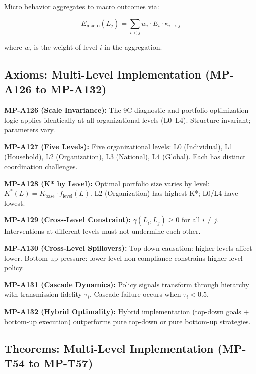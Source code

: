 Micro behavior aggregates to macro outcomes via:

\begin{equation}
E_{\text{macro}}(L_j) = \sum_{i < j} w_i \cdot E_i \cdot \kappa_{i \to j}
\end{equation}

where $w_i$ is the weight of level $i$ in the aggregation.

\subsection{Axioms: Multi-Level Implementation (MP-A126 to MP-A132)}

\begin{tcolorbox}[colback=red!3!white, colframe=red!50!black,
    title=\textbf{Axioms: Multi-Level Implementation Theory (Chapter 23)}]

\textbf{MP-A126 (Scale Invariance):} The 9C diagnostic and portfolio optimization logic applies identically at all organizational levels (L0--L4). Structure invariant; parameters vary.

\textbf{MP-A127 (Five Levels):} Five organizational levels: L0 (Individual), L1 (Household), L2 (Organization), L3 (National), L4 (Global). Each has distinct coordination challenges.

\textbf{MP-A128 (K* by Level):} Optimal portfolio size varies by level: $K^*(L) = K_{\text{base}} \cdot f_{\text{level}}(L)$. L2 (Organization) has highest K*; L0/L4 have lowest.

\textbf{MP-A129 (Cross-Level Constraint):} $\gamma(L_i, L_j) \geq 0$ for all $i \neq j$. Interventions at different levels must not undermine each other.

\textbf{MP-A130 (Cross-Level Spillovers):} Top-down causation: higher levels affect lower. Bottom-up pressure: lower-level non-compliance constrains higher-level policy.

\textbf{MP-A131 (Cascade Dynamics):} Policy signals transform through hierarchy with transmission fidelity $\tau_i$. Cascade failure occurs when $\tau_i < 0.5$.

\textbf{MP-A132 (Hybrid Optimality):} Hybrid implementation (top-down goals + bottom-up execution) outperforms pure top-down or pure bottom-up strategies.

\end{tcolorbox}

\subsection{Theorems: Multi-Level Implementation (MP-T54 to MP-T57)}

